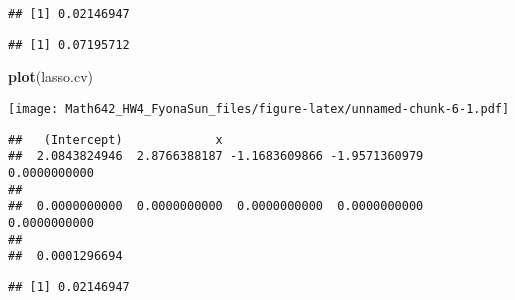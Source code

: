 \documentclass[]{article}
\newenvironment{Shaded}{\begin{snugshade}}{\end{snugshade}}
\newcommand{\KeywordTok}[1]{\textcolor[rgb]{0.13,0.29,0.53}{\textbf{{#1}}}}
\newcommand{\DataTypeTok}[1]{\textcolor[rgb]{0.13,0.29,0.53}{{#1}}}
\newcommand{\DecValTok}[1]{\textcolor[rgb]{0.00,0.00,0.81}{{#1}}}
\newcommand{\NormalTok}[1]{{#1}}
\begin{document}
\begin{verbatim}
## [1] 0.02146947
\end{verbatim}

\begin{Shaded}
\end{Shaded}

\begin{verbatim}
## [1] 0.07195712
\end{verbatim}

\begin{Shaded}
\begin{Highlighting}[]
\KeywordTok{plot}\NormalTok{(lasso.cv)}
\end{Highlighting}
\end{Shaded}

\texttt{[image: Math642\_HW4\_FyonaSun\_files/figure-latex/unnamed-chunk-6-1.pdf]}

\begin{Shaded}
\end{Shaded}

\begin{verbatim}
##   (Intercept)             x                                           
##  2.0843824946  2.8766388187 -1.1683609866 -1.9571360979  0.0000000000 
##                                                                       
##  0.0000000000  0.0000000000  0.0000000000  0.0000000000  0.0000000000 
##               
##  0.0001296694
\end{verbatim}

\begin{Shaded}
\end{Shaded}

\begin{verbatim}
## [1] 0.02146947
\end{verbatim}

\begin{Shaded}
\end{Shaded}
\end{document}
